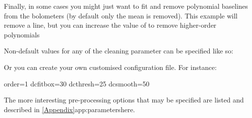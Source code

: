 Finally, in some cases you might just want to fit and remove
polynomial baselines from the bolometers (by default only the mean is
removed). This example will remove a line, but you can increase the
value of  to remove higher-order polynomials

\begin{terminalv}
\end{terminalv}

Non-default values for any of the cleaning parameter can be specified like so:
\begin{terminalv}
\end{terminalv}
Or you can create your own customised configuration file. For instance:

\begin{terminalv}
order=1
dcfitbox=30
dcthresh=25
dcsmooth=50
\end{terminalv}

The more interesting pre-processing options that may be specified are listed
and described in \cref{Appendix}{app:parameters}{here}.




